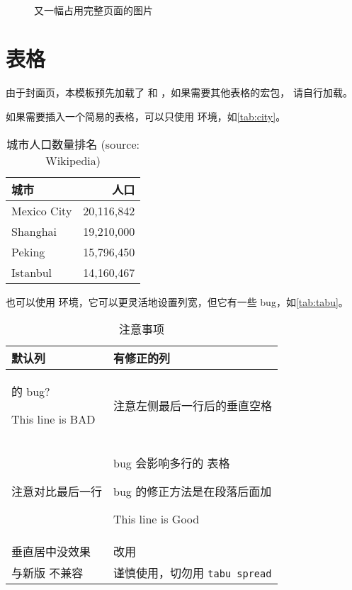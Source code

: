 \setcounter{subfigure}{0}
\begin{sidewaysfigure}
   \\
  \caption{又一幅占用完整页面的图片}
  \label{fig:fullpage2}
\end{sidewaysfigure}

\section{表格}

由于封面页，本模板预先加载了  和 ，如果需要其他表格的宏包，
请自行加载。

如果需要插入一个简易的表格，可以只使用  环境，如\autoref{tab:city}。
\begin{table}[htb]
  \caption[城市人口]{城市人口数量排名 (source: Wikipedia)\label{tab:city}}
  \begin{tabular}{lr}
    \toprule
    城市 & 人口 \\
    \midrule
    Mexico City & 20,116,842\\
    Shanghai & 19,210,000\\
    Peking & 15,796,450\\
    Istanbul & 14,160,467\\
    \bottomrule
  \end{tabular}
\end{table}

也可以使用  环境，它可以更灵活地设置列宽，但它有一些 bug，如\autoref{tab:tabu}。
\begin{table}[htb]
  \caption{ 注意事项 \label{tab:tabu}}
  \begin{tabu} to .9 \toprule
    默认列 & 有修正的列 \\ \midrule
     的 bug? \par This line is BAD & 注意左侧最后一行后的垂直空格 \\ \midrule
    注意对比最后一行 &
      bug 会影响多行的  表格 \par
      bug 的修正方法是在段落后面加  \par
      This line is Good \\ \midrule
    垂直居中没效果 & 改用  \\ \midrule
    与新版  不兼容 & 谨慎使用，切勿用 \texttt{tabu spread} \\ \bottomrule
  \end{tabu}
\end{table}

